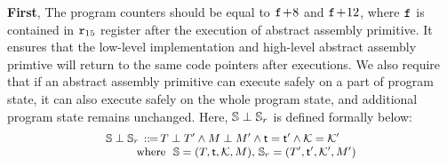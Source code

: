 \begin{definition}
\begin{enumerate}[1.]
    \end{enumerate}
\end{definition}

\textbf{First}, 
The program counters should be equal to
$\texttt{f}_{}\!+\!8$ and $\texttt{f}_{}\!+\!12$, where $\texttt{f}_{}$
is contained in $\texttt{r}_{15}$ register after the execution
of abstract assembly primitive.
It ensures that the low-level implementation
and high-level abstract assembly primtive will return to
the same code pointers after executions.
We also require that
if an abstract assembly primitive
can execute safely on a part of program state,
it can also execute safely on the whole program state,
and additional program state remains unchanged.
Here, $\mathbb{S}\perp\mathbb{S}_r$ is defined formally
below:
\[
    \small
    \begin{array}{l}
        \mathbb{S}\perp\mathbb{S}_r \, ::\!\!{=} \,
        T\perp T' \land
        M\perp M' \land \textsf{t} = \textsf{t}'
        \land \mathcal{K} = \mathcal{K}' \\
        \qquad \ \
        \text{where} \ \
        \mathbb{S} = (T, \textsf{t}, \mathcal{K}, M), \,
        \mathbb{S}_r = (T', \textsf{t}', \mathcal{K}', M')
    \end{array}
\]
